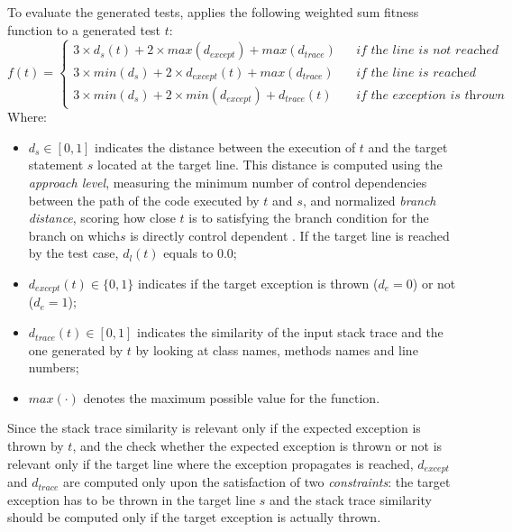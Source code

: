 To evaluate the generated tests, \evocrash applies the following weighted sum fitness function \cite{Soltani2018a} to a generated test $t$:
%
\begin{equation} \label{eq:fitnessfunction}
f(t) = 
\left\{
  \begin{array}{lcr}
    3 \times d_{s}(t) + 2 \times max(d_{except}) + max(d_{trace})   && \textit{if the line is not reached}\\
    3 \times min(d_{s}) + 2 \times d_{except}(t) + max(d_{trace})   && \textit{if the line is reached}\\
    3 \times min(d_{s}) + 2 \times min(d_{except}) + d_{trace}(t)   && \textit{if the exception is thrown}
  \end{array}
\right.
\end{equation}
%
Where:
%
\begin{itemize}
\item $d_{s} \in [0,1]$ indicates the distance between the execution of $t$ and the target statement $s$ located at the target line. 
This distance is computed using the \textit{approach level}, measuring the minimum number of control dependencies between the path of the code executed by $t$ and $s$, and normalized \textit{branch distance}, scoring how close $t$ is to satisfying the branch condition for the branch on which$s$ is directly control dependent \cite{McMinn2004}. 
If the target line is reached by the test case, $d_{l}(t)$ equals to $0.0$;
%
\item $d_{except}(t) \in \{0,1\}$ indicates if the target exception is thrown ($d_{e} = 0$) or not ($d_{e} = 1$);
%
\item $d_{trace}(t) \in [0,1]$ indicates the similarity of the input stack trace and the one generated by $t$ by looking at class names, methods names and line numbers;
%
\item $max(\cdot)$ denotes the maximum possible value for the function.
\end{itemize}
%
Since the stack trace similarity is relevant only if the expected exception is thrown by $t$, and the check whether  the expected exception is thrown or not is relevant only if the target line where the exception propagates is reached, $d_{except}$ and $d_{trace}$ are computed only upon the satisfaction of two \emph{constraints}: the target exception has to be thrown in the target line $s$ and the stack trace similarity should be computed only if the target exception is actually thrown. 

